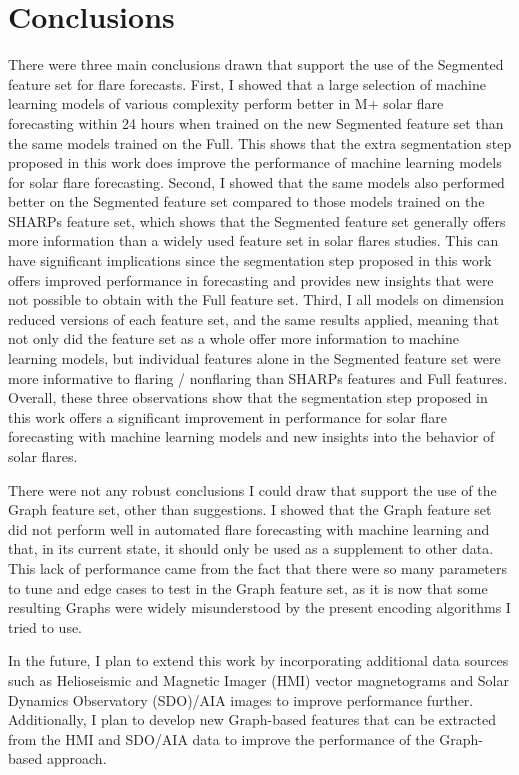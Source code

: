 \documentclass[defaultstyle,11pt]{thesis}
\begin{document}
\chapter{Conclusions}

There were three main conclusions drawn that support the use of the Segmented feature set for flare forecasts. First, I showed that a large selection of machine learning models of various complexity perform better in M+ solar flare forecasting within 24 hours when trained on the new Segmented feature set than the same models trained on the Full. This shows that the extra segmentation step proposed in this work does improve the performance of machine learning models for solar flare forecasting. Second, I showed that the same models also performed better on the Segmented feature set compared to those models trained on the SHARPs feature set, which shows that the Segmented feature set generally offers more information than a widely used feature set in solar flares studies. This can have significant implications since the segmentation step proposed in this work offers improved performance in forecasting and provides new insights that were not possible to obtain with the Full feature set. Third, I all models on dimension reduced versions of each feature set, and the same results applied, meaning that not only did the feature set as a whole offer more information to machine learning models, but individual features alone in the Segmented feature set were more informative to flaring / nonflaring than SHARPs features and Full features. Overall, these three observations show that the segmentation step proposed in this work offers a significant improvement in performance for solar flare forecasting with machine learning models and new insights into the behavior of solar flares. 

There were not any robust conclusions I could draw that support the use of the Graph feature set, other than suggestions. I showed that the Graph feature set did not perform well in automated flare forecasting with machine learning and that, in its current state, it should only be used as a supplement to other data. This lack of performance came from the fact that there were so many parameters to tune and edge cases to test in the Graph feature set, as it is now that some resulting Graphs were widely misunderstood by the present encoding algorithms I tried to use.  

In the future,  I plan to extend this work by incorporating additional data sources such as Helioseismic and Magnetic Imager (HMI) vector magnetograms and Solar Dynamics Observatory (SDO)/AIA images to improve performance further. Additionally, I plan to develop new Graph-based features that can be extracted from the HMI and SDO/AIA data to improve the performance of the Graph-based approach. 
\end{document}

